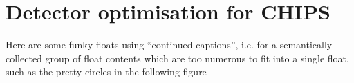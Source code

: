 \chapter{Detector optimisation for CHIPS}
\label{chap:optimisation}

Here are some funky floats using ``continued captions'', i.e. for a semantically
collected group of float contents which are too numerous to fit into a single
float, such as the pretty circles in the following figure